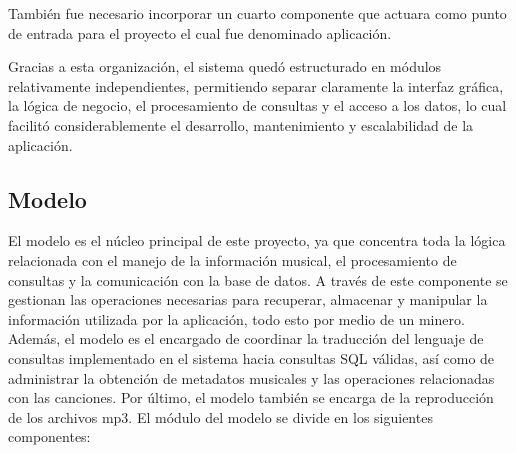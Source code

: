 \documentclass[12pt]{article}
\begin{document}
También fue necesario incorporar un cuarto componente que actuara como punto de entrada para el proyecto el cual fue denominado aplicación.

Gracias a esta organización, el sistema quedó estructurado en módulos relativamente independientes, permitiendo separar claramente la interfaz gráfica, la lógica de negocio, el procesamiento de consultas y el acceso a los datos, lo cual facilitó considerablemente el desarrollo, mantenimiento y escalabilidad de la aplicación.

\subsection{Modelo}

El modelo es el núcleo principal de este proyecto, ya que concentra toda la lógica relacionada con el manejo de la información musical, el procesamiento de consultas y la comunicación con la base de datos. A través de este componente se gestionan las operaciones necesarias para recuperar, almacenar y manipular la información utilizada por la aplicación, todo esto por medio de un minero. Además, el modelo es el encargado de coordinar la traducción del lenguaje de consultas implementado en el sistema hacia consultas SQL válidas, así como de administrar la obtención de metadatos musicales y las operaciones relacionadas con las canciones. Por último, el modelo también se encarga de la reproducción de los archivos mp3. El módulo del modelo se divide en los siguientes componentes:
\end{document}
